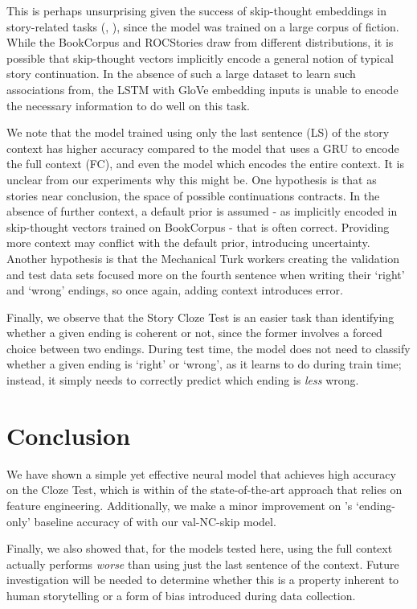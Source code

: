 \documentclass[11pt,a4paper]{article}
\begin{document}
This is perhaps unsurprising given the success of skip-thought embeddings in story-related tasks (\citet{Agrawal2016SortSS}, \citet{roemmele2017rnn}), since the model was trained on a large corpus of fiction. While the BookCorpus and ROCStories draw from different distributions, it is possible that skip-thought vectors implicitly encode a general notion of typical story continuation. In the absence of such a large dataset to learn such associations from, the LSTM with GloVe embedding inputs is unable to encode the necessary information to do well on this task.



We note that the model trained using only the last sentence (LS) of the story context has higher accuracy compared to the model that uses a GRU to encode the full context (FC), and even the \citet{Cai2017PayAT} model which encodes the entire context.
It is unclear from our experiments why this might be.
One hypothesis is that as stories near conclusion, the space of possible continuations contracts.
In the absence of further context, a default prior is assumed - as implicitly encoded in skip-thought vectors trained on BookCorpus - that is often correct. 
Providing more context may conflict with the default prior, introducing uncertainty.
Another hypothesis is that the Mechanical Turk workers creating the validation and test data sets focused more on the fourth sentence when writing their `right' and `wrong' endings, so once again, adding context introduces error.

Finally, we observe that the Story Cloze Test is an easier task than identifying whether a given ending is coherent or not, since the former involves a forced choice between two endings. During test time, the model does not need to classify whether a given ending is `right' or `wrong', as it learns to do during train time; instead, it simply needs to correctly predict which ending is \emph{less} wrong. 

\section{Conclusion}
\label{sec:length}
We have shown a simple yet effective neural model that achieves high accuracy on the Cloze Test, which is within  of the state-of-the-art approach that relies on feature engineering. Additionally, we make a minor improvement on \citet{Cai2017PayAT}'s `ending-only' baseline accuracy of  with our val-NC-skip model.
  
Finally, we also showed that, for the models tested here, using the full
context actually performs \emph{worse} than using just the last sentence of the context.
Future investigation will be needed to determine whether this is a property inherent to human storytelling or a form of bias introduced during data collection.
\end{document}
